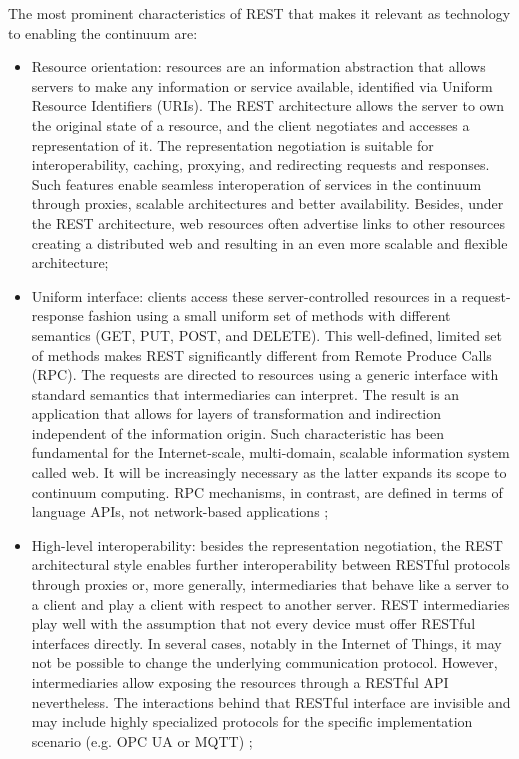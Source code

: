 The most prominent characteristics of REST that makes it relevant as technology to enabling the continuum are:

\begin{itemize}
    \item Resource orientation: resources are an information abstraction that allows servers to make any information or service available, identified via Uniform Resource Identifiers (URIs). The REST architecture allows the server to own the original state of a resource, and the client negotiates and accesses a representation of it. The representation negotiation is suitable for interoperability, caching, proxying, and redirecting requests and responses. Such features enable seamless interoperation of services in the continuum through proxies, scalable architectures and better availability. Besides, under the REST architecture, web resources often advertise links to other resources creating a distributed web and resulting in an even more scalable and flexible architecture;
    \item Uniform interface: clients access these server-controlled resources in a request-response fashion using a small uniform set of methods with different semantics (GET, PUT, POST, and DELETE). This well-defined, limited set of methods makes REST significantly different from Remote Produce Calls (RPC). The requests are directed to resources using a generic interface with standard semantics that intermediaries can interpret. The result is an application that allows for layers of transformation and indirection independent of the information origin. Such characteristic has been fundamental for the Internet-scale, multi-domain, scalable information system called web. It will be increasingly necessary as the latter expands its scope to continuum computing. RPC mechanisms, in contrast, are defined in terms of language APIs, not network-based applications \cite{rest};
    \item High-level interoperability: besides the representation negotiation, the REST architectural style enables further interoperability between RESTful protocols through proxies or, more generally, intermediaries that behave like a server to a client and play a client with respect to another server. REST intermediaries play well with the assumption that not every device must offer RESTful interfaces directly. In several cases, notably in the Internet of Things, it may not be possible to change the underlying communication protocol. However, intermediaries allow exposing the resources through a RESTful API nevertheless. The interactions behind that RESTful interface are invisible and may include highly specialized protocols for the specific implementation scenario (e.g. OPC UA or MQTT) \cite{web-of-things};

\end{itemize}
